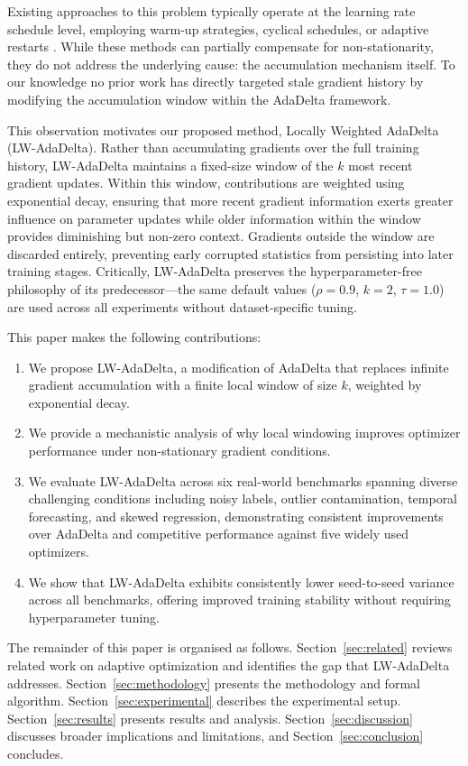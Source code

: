 \documentclass[11pt,a4paper]{article}
\begin{document}
Existing approaches to this problem typically operate at the learning rate schedule level, employing warm-up strategies, cyclical schedules, or adaptive restarts \citep{loshchilov2016cosine}. While these methods can partially compensate for non-stationarity, they do not address the underlying cause: the accumulation mechanism itself. To our knowledge no prior work has directly targeted stale gradient history by modifying the accumulation window within the AdaDelta framework.

This observation motivates our proposed method, Locally Weighted AdaDelta (LW-AdaDelta). Rather than accumulating gradients over the full training history, LW-AdaDelta maintains a fixed-size window of the $k$ most recent gradient updates. Within this window, contributions are weighted using exponential decay, ensuring that more recent gradient information exerts greater influence on parameter updates while older information within the window provides diminishing but non-zero context. Gradients outside the window are discarded entirely, preventing early corrupted statistics from persisting into later training stages. Critically, LW-AdaDelta preserves the hyperparameter-free philosophy of its predecessor---the same default values ($\rho = 0.9$, $k = 2$, $\tau = 1.0$) are used across all experiments without dataset-specific tuning.

This paper makes the following contributions:
\begin{enumerate}
    \item We propose LW-AdaDelta, a modification of AdaDelta that replaces infinite gradient accumulation with a finite local window of size $k$, weighted by exponential decay.
    \item We provide a mechanistic analysis of why local windowing improves optimizer performance under non-stationary gradient conditions.
    \item We evaluate LW-AdaDelta across six real-world benchmarks spanning diverse challenging conditions including noisy labels, outlier contamination, temporal forecasting, and skewed regression, demonstrating consistent improvements over AdaDelta and competitive performance against five widely used optimizers.
    \item We show that LW-AdaDelta exhibits consistently lower seed-to-seed variance across all benchmarks, offering improved training stability without requiring hyperparameter tuning.
\end{enumerate}

The remainder of this paper is organised as follows. Section~\ref{sec:related} reviews related work on adaptive optimization and identifies the gap that LW-AdaDelta addresses. Section~\ref{sec:methodology} presents the methodology and formal algorithm. Section~\ref{sec:experimental} describes the experimental setup. Section~\ref{sec:results} presents results and analysis. Section~\ref{sec:discussion} discusses broader implications and limitations, and Section~\ref{sec:conclusion} concludes.
\end{document}
